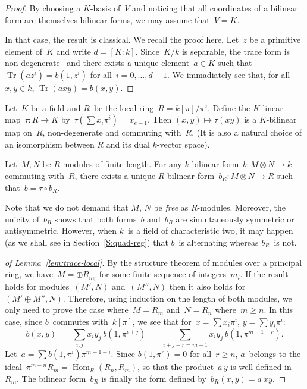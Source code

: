 \documentclass{lms}
\DeclareMathOperator\Hom{Hom}
\DeclareMathOperator\Tr{Tr}
\begin{document}
\begin{proof}
By choosing a $K$-basis of~$V$ and noticing that
all coordinates of a bilinear form are themselves bilinear forms,
we may assume that~$V = K$.

In that case, the result is classical. We recall the proof here.
Let~$z$ be a primitive element of~$K$ and write $d = [K:k]$.
Since~$K/k$ is separable, the trace form is
non-degenerate~\cite[VI~5.2]{lang-algebra}
and there exists a unique element~$a ∈ K$ such that
$\Tr (a z^i) = b(1, z^i)$ for all~$i=0, …, d-1$.
We immadiately see that, for all~$x, y ∈ k$, $\Tr (a x y) = b(x, y)$.

\end{proof}


Let~$K$ be a field and $R$~be the local ring~$R = k[π]/π^e$.
Define the $K$-linear map~$τ: R → K$ by~$τ(∑ x_i π^i) = x_{e-1}$.
Then $(x, y) ↦ τ(xy)$ is a $K$-bilinear map on~$R$,
non-degenerate and commuting with~$R$.
(It is also a natural choice of an isomorphism
between $R$ and its dual $k$-vector space).

\begin{lem}\label{lem:trace-local}
Let~$M, N$ be $R$-modules of finite length.
For any $k$-bilinear form~$b: M ⊗ N → k$ commuting with~$R$,
there exists a unique $R$-bilinear form~$b_R: M ⊗ N → R$
such that~$b = τ ∘ b_R$.
\end{lem}

Note that we do not demand that $M$, $N$ be \emph{free} as $R$-modules.
Moreover, the unicity of~$b_R$ shows that both forms~$b$ and~$b_R$ are
simultaneously symmetric or antisymmetric.
However, when $k$~is a field of characteristic two, it may happen (as we
shall see in Section~\ref{S:quad-reg}) that $b$~is alternating whereas
$b_R$~is not.

\begin{proof}[{of Lemma~\ref{lem:trace-local}}]
By the structure theorem of modules over a principal ring,
we have~$M = ⊕ R_{m_i}$ for some finite sequence of integers~$m_i$.
If the result holds for modules~$(M', N)$ and~$(M'', N)$ then
it also holds for~$(M' ⊕ M'', N)$.
Therefore, using induction on the length of both modules,
we only need to prove the case where~$M = R_m$ and~$N = R_n$ where~$m ≥ n$.
In this case, since $b$~commutes with~$k[π]$,
we see that for~$x = ∑ x_i π^i$, $y = ∑ y_i π^i$:
\begin{equation}
b(x,y) \;=\; ∑_{i,j} x_i y_j\: b(1, π^{i+j})
  \;=\; ∑_{i+j+r = m-1} x_i y_j\: b(1, π^{m-1-r}).
\end{equation}
Let~$a = ∑ b(1, π^{i}) π^{m-1-i}$. Since $b(1, π^{r}) = 0$ for all~$r ≥
n$, $a$~belongs to the ideal~$π^{m-n} R_m = \Hom_R (R_n, R_m)$, so that
the product~$a\,y$ is well-defined in~$R_m$. The bilinear form~$b_R$ is
finally the form defined by~$b_R(x,y) = a\:x y$.
\end{proof}
\end{document}
